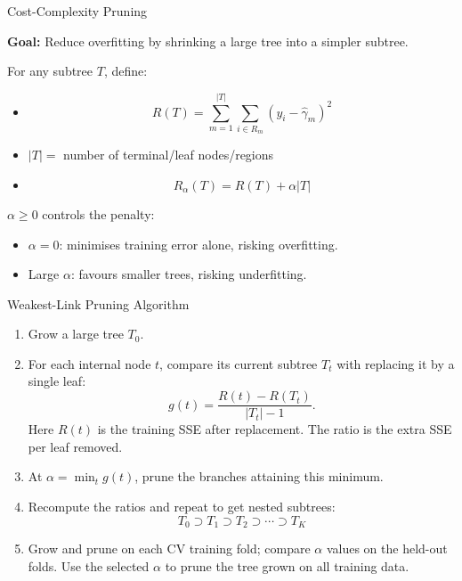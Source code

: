 \documentclass[10pt]{beamer}
\begin{document}
\begin{frame}{Cost-Complexity Pruning}

\textbf{Goal:} Reduce overfitting by shrinking a large tree into a simpler subtree.

\bigskip
For any subtree $T$, define:

\begin{itemize}
    \item {}
    \[
    R(T) = \sum_{m=1}^{|T|} \sum_{i \in R_m} (y_i - \hat{\gamma}_m)^2
    \]
    \item {} $|T| =$ number of terminal/leaf nodes/regions
    \item {}
    \[
    R_{\alpha}(T) = R(T) + \alpha |T|
    \]
\end{itemize}

\bigskip
$\alpha \ge 0$ controls the penalty:
\begin{itemize}
    \item $\alpha = 0$: minimises training error alone, risking overfitting.
    \item Large $\alpha$: favours smaller trees, risking underfitting.
\end{itemize}

\end{frame}

\begin{frame}{Weakest-Link Pruning Algorithm}

\begin{enumerate}
    \item Grow a large tree $T_0$.
    \item For each internal node $t$, compare its current subtree $T_t$ with replacing it by a single leaf:
    \[
        g(t) = \frac{R(t)-R(T_t)}{|T_t|-1}.
    \]
    Here $R(t)$ is the training SSE after replacement. The ratio is the extra SSE per leaf removed.
    \item At $\alpha=\min_t g(t)$, prune the branches attaining this minimum.
    \item Recompute the ratios and repeat to get nested subtrees:
    \[
        T_0 \supset T_1 \supset T_2 \supset \cdots \supset T_K
    \]
    \item Grow and prune on each CV training fold; compare $\alpha$ values on the held-out folds. Use the selected $\alpha$ to prune the tree grown on all training data.
\end{enumerate}

\end{frame}
\end{document}
